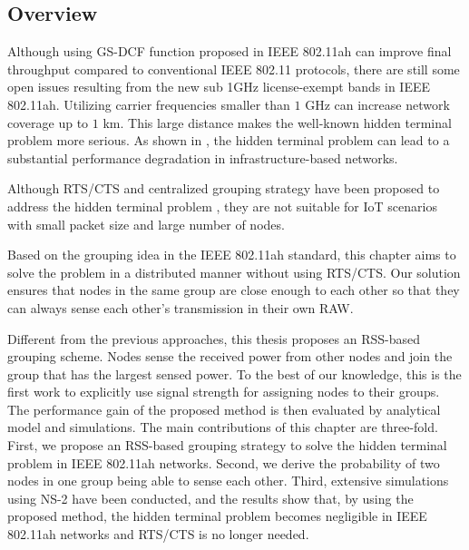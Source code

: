 \subsection{Overview}

Although using GS-DCF function proposed in IEEE 802.11ah can improve final throughput compared to conventional IEEE 802.11 protocols, there are still some open issues resulting from the new sub 1GHz license-exempt bands in IEEE 802.11ah. Utilizing carrier frequencies smaller than $1$ GHz can increase network coverage up to $1$ km. This large distance makes the well-known hidden terminal problem more serious. As shown in \cite{wu2006wsn02,tsertou2008revisiting,khurana1999performance}, the hidden terminal problem can lead to a substantial performance degradation in infrastructure-based networks. 

Although RTS/CTS and centralized grouping strategy have been proposed to address the hidden terminal problem \cite{yoonregrouping,tseng2014effective}, they are not suitable for IoT scenarios with small packet size and large number of nodes.


  Based on the grouping idea in the IEEE 802.11ah standard, this chapter aims to solve the problem in a distributed manner without using RTS/CTS. Our solution ensures that nodes in the same group are close enough to each other so that they can always sense each other's transmission in their own RAW. 

Different from the previous approaches, this thesis proposes an RSS-based grouping scheme.
Nodes sense the received power from other nodes and join the group that has the largest sensed power. To the best of our knowledge, this is the first work to explicitly use signal strength for assigning nodes to their groups. The performance gain of the proposed method is then evaluated by analytical model and simulations. The main contributions of this chapter are three-fold. First, we propose an RSS-based grouping strategy to solve the hidden terminal problem in IEEE 802.11ah networks. Second, we derive the probability of two nodes in one group being able to sense each other. Third, extensive simulations using NS-2\cite{breslau2000advances} have been conducted, and the results show that, by using the proposed method, the hidden terminal problem becomes negligible in IEEE 802.11ah networks and RTS/CTS is no longer needed.


